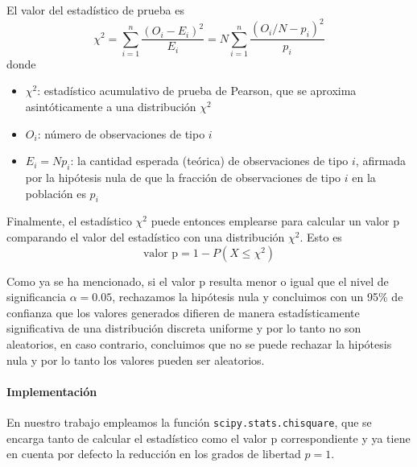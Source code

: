 El valor del estadístico de prueba es
\begin{equation}
\label{eq:estadistico-chi2}
\chi^{2} = \sum_{i=1}^{n}{\frac{(O_{i}-E_{i})^{2}}{E_{i}}} = N\sum_{i=1}^{n}{\frac{\left(O_{i}/N-p_{i}\right)^{2}}{p_{i}}}
\end{equation}
donde
\begin{itemize}
  \item $\chi^2$: estadístico acumulativo de prueba de Pearson, que se aproxima asintóticamente a una distribución $\chi^{2}$
  \item $O_{i}$: número de observaciones de tipo $i$
  \item $E_{i} = Np_{i}$: la cantidad esperada (teórica) de observaciones de tipo $i$, afirmada por la hipótesis nula de que la fracción de observaciones de tipo $i$ en la población es $p_{i}$
\end{itemize}

Finalmente, el estadístico $\chi^{2}$ puede entonces emplearse para calcular un valor p comparando el valor del estadístico con una distribución $\chi^{2}$. Esto es
\begin{equation}
  \label{eq:p-value}
  \text{valor p} = 1 - P(X \le \chi^2)
\end{equation}

Como ya se ha mencionado, si el valor p resulta menor o igual que el nivel de significancia $\alpha = 0.05$, rechazamos la hipótesis nula y concluimos con un 95\% de confianza que los valores generados difieren de manera estadísticamente significativa de una distribución discreta uniforme y por lo tanto no son aleatorios, en caso contrario, concluimos que no se puede rechazar la hipótesis nula y por lo tanto los valores pueden ser aleatorios.

\paragraph{Implementación}
En nuestro trabajo empleamos la función \texttt{scipy.stats.chisquare}, que se encarga tanto de calcular el estadístico como el valor p correspondiente y ya tiene en cuenta por defecto la reducción en los grados de libertad $p = 1$.

\nocite{enwiki2022pearson}
